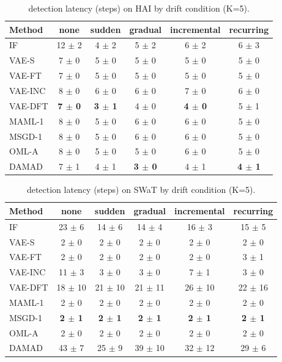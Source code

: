 \begin{table}[t]
\centering
\small
\caption{detection latency (steps) on HAI by drift condition (K=5).}
\label{tab:drift_latency_mean_hai}
\begin{tabular}{lccccc}
\toprule
Method & none & sudden & gradual & incremental & recurring \\
\midrule
IF & 12 $\pm$ 2 & 4 $\pm$ 2 & 5 $\pm$ 2 & 6 $\pm$ 2 & 6 $\pm$ 3 \\
VAE-S & 7 $\pm$ 0 & 5 $\pm$ 0 & 5 $\pm$ 0 & 5 $\pm$ 0 & 5 $\pm$ 0 \\
VAE-FT & 7 $\pm$ 0 & 5 $\pm$ 0 & 5 $\pm$ 0 & 5 $\pm$ 0 & 5 $\pm$ 0 \\
VAE-INC & 8 $\pm$ 0 & 6 $\pm$ 0 & 6 $\pm$ 0 & 7 $\pm$ 0 & 6 $\pm$ 0 \\
VAE-DFT & \textbf{7 $\pm$ 0} & \textbf{3 $\pm$ 1} & 4 $\pm$ 0 & \textbf{4 $\pm$ 0} & 5 $\pm$ 1 \\
MAML-1 & 8 $\pm$ 0 & 5 $\pm$ 0 & 6 $\pm$ 0 & 6 $\pm$ 0 & 5 $\pm$ 0 \\
MSGD-1 & 8 $\pm$ 0 & 5 $\pm$ 0 & 6 $\pm$ 0 & 6 $\pm$ 0 & 5 $\pm$ 0 \\
OML-A & 8 $\pm$ 0 & 5 $\pm$ 0 & 5 $\pm$ 0 & 6 $\pm$ 0 & 5 $\pm$ 0 \\
DAMAD & 7 $\pm$ 1 & 4 $\pm$ 1 & \textbf{3 $\pm$ 0} & 4 $\pm$ 1 & \textbf{4 $\pm$ 1} \\
\bottomrule
\end{tabular}
\end{table}

\begin{table}[t]
\centering
\small
\caption{detection latency (steps) on SWaT by drift condition (K=5).}
\label{tab:drift_latency_mean_swat}
\begin{tabular}{lccccc}
\toprule
Method & none & sudden & gradual & incremental & recurring \\
\midrule
IF & 23 $\pm$ 6 & 14 $\pm$ 6 & 14 $\pm$ 4 & 16 $\pm$ 3 & 15 $\pm$ 5 \\
VAE-S & 2 $\pm$ 0 & 2 $\pm$ 0 & 2 $\pm$ 0 & 2 $\pm$ 0 & 2 $\pm$ 0 \\
VAE-FT & 2 $\pm$ 0 & 2 $\pm$ 0 & 2 $\pm$ 0 & 2 $\pm$ 0 & 3 $\pm$ 1 \\
VAE-INC & 11 $\pm$ 3 & 3 $\pm$ 0 & 3 $\pm$ 0 & 7 $\pm$ 1 & 3 $\pm$ 0 \\
VAE-DFT & 18 $\pm$ 10 & 21 $\pm$ 10 & 21 $\pm$ 11 & 26 $\pm$ 10 & 22 $\pm$ 16 \\
MAML-1 & 2 $\pm$ 0 & 2 $\pm$ 0 & 2 $\pm$ 0 & 2 $\pm$ 0 & 2 $\pm$ 0 \\
MSGD-1 & \textbf{2 $\pm$ 1} & \textbf{2 $\pm$ 1} & \textbf{2 $\pm$ 1} & \textbf{2 $\pm$ 1} & \textbf{2 $\pm$ 1} \\
OML-A & 2 $\pm$ 0 & 2 $\pm$ 0 & 2 $\pm$ 0 & 2 $\pm$ 0 & 2 $\pm$ 0 \\
DAMAD & 43 $\pm$ 7 & 25 $\pm$ 9 & 39 $\pm$ 10 & 32 $\pm$ 12 & 29 $\pm$ 6 \\
\bottomrule
\end{tabular}
\end{table}

